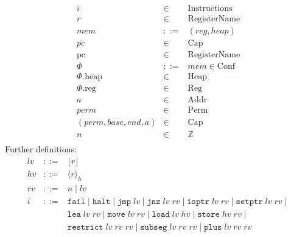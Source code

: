 \documentclass{article}
\newcommand{\var}[1]{\mathit{#1}}
\newcommand{\hv}{\var{hv}}
\newcommand{\rv}{\var{rv}}
\newcommand{\lv}{\var{lv}}
\newcommand{\pc}{\mathit{pc}}
\newcommand{\pcreg}{\mathrm{pc}}
\newcommand{\addr}{\var{a}}
\newcommand{\start}{\var{base}}
\newcommand{\addrend}{\var{end}}
\newcommand{\mem}{\var{mem}}
\newcommand{\reg}{\var{reg}}
\newcommand{\heap}{\var{heap}}
\newcommand{\perm}{\var{perm}}
\newcommand{\plainproj}[1]{\mathrm{#1}}
\newcommand{\memheap}[1][\Phi]{#1.\plainproj{heap}}
\newcommand{\memreg}[1][\Phi]{#1.\plainproj{reg}}
\newcommand{\plaindom}[1]{\mathrm{#1}}
\newcommand{\Caps}{\plaindom{Cap}}
\newcommand{\Addrs}{\plaindom{Addr}}
\newcommand{\RegName}{\plaindom{RegisterName}}
\newcommand{\Regs}{\plaindom{Reg}}
\newcommand{\Heaps}{\plaindom{Heap}}
\newcommand{\Confs}{\plaindom{Conf}}
\newcommand{\Instrs}{\plaindom{Instructions}}
\newcommand{\ints}{\mathbb{Z}}
\newcommand{\Perms}{\plaindom{Perm}}
\newcommand{\refreg}[1]{\lfloor #1 \rfloor}
\newcommand{\refheap}[1]{\langle #1 \rangle_h}
\newcommand{\zinstr}[1]{\mathtt{#1}}
\newcommand{\fail}{\zinstr{fail}}
\newcommand{\halt}{\zinstr{halt}}
\newcommand{\oneinstr}[2]{\zinstr{#1} \; #2}
\newcommand{\jmp}[1]{\oneinstr{jmp}{#1}}
\newcommand{\twoinstr}[3]{\zinstr{#1} \; #2 \; #3}
\newcommand{\jnz}[2]{\twoinstr{jnz}{#1}{#2}}
\newcommand{\isptr}[2]{\twoinstr{isptr}{#1}{#2}}
\newcommand{\setptr}[2]{\twoinstr{setptr}{#1}{#2}}
\newcommand{\move}[2]{\twoinstr{move}{#1}{#2}}
\newcommand{\store}[2]{\twoinstr{store}{#1}{#2}}
\newcommand{\load}[2]{\twoinstr{load}{#1}{#2}}
\newcommand{\lea}[2]{\twoinstr{lea}{#1}{#2}}
\newcommand{\threeinstr}[4]{\zinstr{#1} \; #2 \; #3 \; #4}
\newcommand{\restrict}[3]{\threeinstr{restrict}{#1}{#2}{#3}}
\newcommand{\subseg}[3]{\threeinstr{subseg}{#1}{#2}{#3}}
\newcommand{\plus}[3]{\threeinstr{plus}{#1}{#2}{#3}}
\begin{document}
$$\begin{array}{rcl}
i       &\in& \Instrs \\
r       &\in& \RegName\\
\mem    &::=& (\reg,\heap)\\
\pc     &\in& \Caps \\
\pcreg  &\in& \RegName \\
\Phi    &::=& \mem \in \Confs\\
\memheap&\in& \Heaps \\
\memreg &\in& \Regs \\
\addr   &\in& \Addrs\\
\perm   &\in& \Perms\\
(\perm,\start,\addrend,\addr) &\in& \Caps \\
n       &\in& \ints\\
\end{array}$$
Further definitions:
$$\begin{array}{rcl}
\lv    &::=& \refreg{r} \\
\hv    &::=& \refheap{r}\\
\rv    &::=& n \mid \lv \\
i      &::=& \fail \mid \halt \mid 
             \jmp{\lv} \mid \jnz{\lv}{\rv} \mid
             \isptr{\lv}{\rv} \mid \setptr{\lv}{\rv} \mid \\
       &   & \lea{\lv}{\rv} \mid\move{\lv}{\rv} \mid \load{\lv}{\hv} \mid \store{\hv}{\rv} \mid  \\
       &   & \restrict{\lv}{\rv}{\rv} \mid \subseg{\lv}{\rv}{\rv} \mid \plus{\lv}{\rv}{\rv}
\end{array}$$
\end{document}

